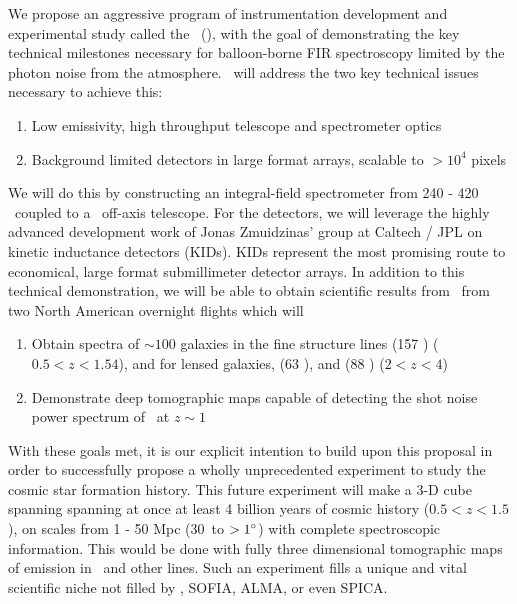 We propose an aggressive program of instrumentation development and experimental study called the \namefull\ (\name), with the goal of demonstrating the key technical milestones necessary for balloon-borne FIR spectroscopy limited by the photon noise from the atmosphere. \name\ will address the two key technical issues necessary to achieve this:
\begin{enumerate}
\parskip-5pt
\item	Low emissivity, high throughput telescope and spectrometer optics 
\item	Background limited detectors in large format arrays, scalable to $>10^4$ pixels
\end{enumerate}
\parskip-5pt
We will do this by constructing an integral-field spectrometer from 240 - 420
\mum\ coupled to a \D\ off-axis telescope.  For the detectors, we will leverage the highly advanced development work of Jonas Zmuidzinas' group at Caltech / JPL on kinetic inductance detectors (KIDs).  KIDs represent the most promising route to economical, large format submillimeter detector arrays.  In addition to this technical demonstration, we will be able to obtain scientific results from \name\ from two North American overnight flights which will
\parskip-5pt
\begin{enumerate}
\parskip-5pt

\item \label{goal:Lines} Obtain spectra of $\sim100$ galaxies in the fine structure lines \cii(157 \mum) ($0.5 < z < 1.54$), and for lensed galaxies, \oi(63 \mum), and \oiii(88 \mum) ($2 < z < 4$)

\item \label{goal:PowerSpectrum} Demonstrate deep tomographic maps capable of detecting the shot noise power spectrum of \cii\ at $z\sim1$

\end{enumerate}
\parskip-5pt
With these goals met, it is our explicit intention to build upon this proposal in order to successfully propose a wholly unprecedented experiment to study the cosmic star formation history.  This future experiment will make a 3-D cube spanning spanning at once at least 4 billion years of
cosmic history ($0.5 < z < 1.5$), on scales from 1 - 50 Mpc (30\arcsec\ to $>1\hbox{$^\circ$}$) with complete spectroscopic
information.   This would be done with fully three dimensional tomographic maps
of emission in \cii\ and other lines.
Such an experiment fills a unique and vital scientific niche not filled by \herschel, SOFIA, ALMA, or even SPICA.

